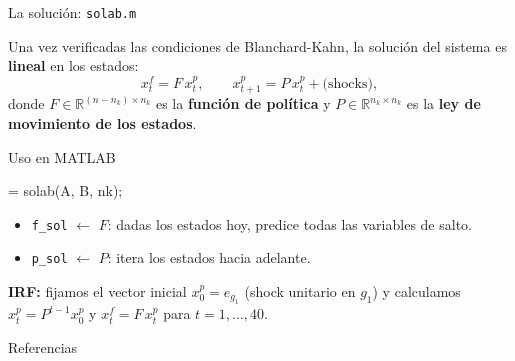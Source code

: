 \begin{frame}{La solución: \texttt{solab.m}}

  Una vez verificadas las condiciones de Blanchard-Kahn, la solución del sistema es
  \textbf{lineal} en los estados:
  \[
    x^f_t = F\, x^p_t, \qquad x^p_{t+1} = P\, x^p_t + \text{(shocks)},
  \]
  donde $F \in \mathbb{R}^{(n-n_k)\times n_k}$ es la \textbf{función de política} y
  $P \in \mathbb{R}^{n_k \times n_k}$ es la \textbf{ley de movimiento de los estados}.

  \bigskip
  \begin{block}{Uso en MATLAB}
    \begin{semiverbatim}
       = solab(A, B, nk);
    \end{semiverbatim}
    \begin{itemize}
      \item \texttt{f\_sol} $\leftarrow$ $F$: dadas los estados hoy, predice todas las
            variables de salto.
      \item \texttt{p\_sol} $\leftarrow$ $P$: itera los estados hacia adelante.
    \end{itemize}
  \end{block}

  \bigskip
  \textbf{IRF:} fijamos el vector inicial $x^p_0 = e_{g_1}$ (shock unitario en $g_1$) y
  calculamos $x^p_t = P^{t-1} x^p_0$ y $x^f_t = F\,x^p_t$ para $t = 1,\ldots,40$.

\end{frame}

\begin{frame}[allowframebreaks]{Referencias}
  \nocite{*}
  \printbibliography
\end{frame}
